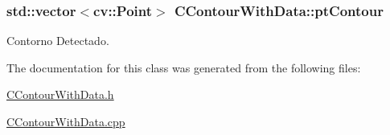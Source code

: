 \subsubsection[{\texorpdfstring{pt\+Contour}{ptContour}}]{\setlength{\rightskip}{0pt plus 5cm}std\+::vector$<$cv\+::\+Point$>$ C\+Contour\+With\+Data\+::pt\+Contour}\hypertarget{classCContourWithData_ace345d75058a013dc37f3b020736c383}{}\label{classCContourWithData_ace345d75058a013dc37f3b020736c383}


Contorno Detectado. 



The documentation for this class was generated from the following files\+:\begin{DoxyCompactItemize}
\item 
\hyperlink{CContourWithData_8h}{C\+Contour\+With\+Data.\+h}\item 
\hyperlink{CContourWithData_8cpp}{C\+Contour\+With\+Data.\+cpp}\end{DoxyCompactItemize}
